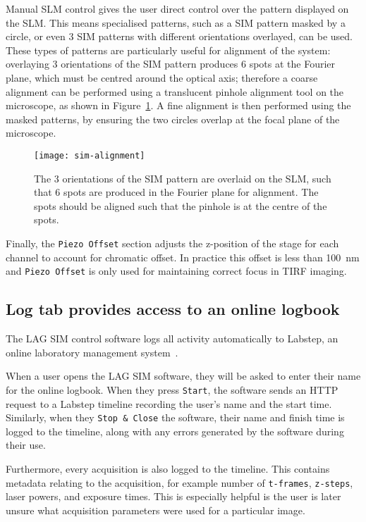 Manual SLM control gives the user direct control over the pattern displayed on the SLM. 
This means specialised patterns, such as a SIM pattern masked by a circle, or even 3 SIM patterns with different orientations overlayed, can be used.
These types of patterns are particularly useful for alignment of the system: overlaying 3 orientations of the SIM pattern produces 6 spots at the Fourier plane, which must be centred around the optical axis; therefore a coarse alignment can be performed using a translucent pinhole alignment tool on the microscope, as shown in Figure~\ref{fig:pinhole-alignment}. 
A fine alignment is then performed using the masked patterns, by ensuring the two circles overlap at the focal plane of the microscope. 

\begin{figure}[htbp!]
\centering
\texttt{[image: sim-alignment]}
\caption[LAG SIM: Displaying specially designed patterns on the SLM assists with alignment of LAG SIM]{The 3 orientations of the SIM pattern are overlaid on the SLM, such that 6 spots are produced in the Fourier plane for alignment. The spots should be aligned such that the pinhole is at the centre of the spots.}
\label{fig:pinhole-alignment}
\end{figure}

Finally, the \texttt{Piezo Offset} section adjusts the z-position of the stage for each channel to account for chromatic offset. 
In practice this offset is less than \SI{100}{\nano\meter} and \texttt{Piezo Offset} is only used for maintaining correct focus in TIRF imaging. 

\subsection{Log tab provides access to an online logbook}
The LAG SIM control software logs all activity automatically to Labstep, an online laboratory management system~\cite{labstep}. 

When a user opens the LAG SIM software, they will be asked to enter their name for the online logbook. 
When they press \texttt{Start}, the software sends an HTTP request to a Labstep timeline recording the user's name and the start time. 
Similarly, when they \texttt{Stop \& Close} the software, their name and finish time is logged to the timeline, along with any errors generated by the software during their use. 

Furthermore, every acquisition is also logged to the timeline. 
This contains metadata relating to the acquisition, for example number of \texttt{t-frames}, \texttt{z-steps}, laser powers, and exposure times. 
This is especially helpful is the user is later unsure what acquisition parameters were used for a particular image. 

